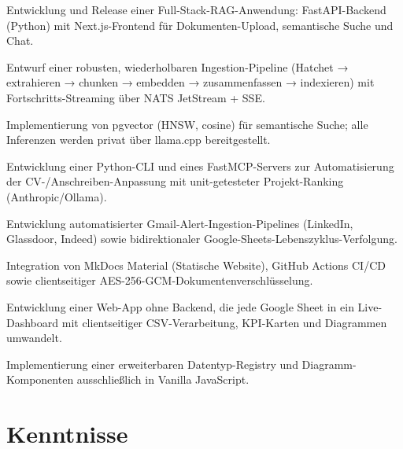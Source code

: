 \documentclass[10pt,a4paper]{resume}
\begin{document}
\bullets
  \item Entwicklung und Release einer Full-Stack-RAG-Anwendung: FastAPI-Backend (Python) mit Next.js-Frontend für Dokumenten-Upload, semantische Suche und Chat.
  \item Entwurf einer robusten, wiederholbaren Ingestion-Pipeline (Hatchet → extrahieren → chunken → embedden → zusammenfassen → indexieren) mit Fortschritts-Streaming über NATS JetStream + SSE.
  \item Implementierung von pgvector (HNSW, cosine) für semantische Suche; alle Inferenzen werden privat über llama.cpp bereitgestellt.
\bulletsend
\vspace{1.0pt}
\bullets
  \item Entwicklung einer Python-CLI und eines FastMCP-Servers zur Automatisierung der CV-/Anschreiben-Anpassung mit unit-getesteter Projekt-Ranking (Anthropic/Ollama).
  \item Entwicklung automatisierter Gmail-Alert-Ingestion-Pipelines (LinkedIn, Glassdoor, Indeed) sowie bidirektionaler Google-Sheets-Lebenszyklus-Verfolgung.
  \item Integration von MkDocs Material (Statische Website), GitHub Actions CI/CD sowie clientseitiger AES-256-GCM-Dokumentenverschlüsselung.
\bulletsend
\vspace{1.0pt}
\bullets
  \item Entwicklung einer Web-App ohne Backend, die jede Google Sheet in ein Live-Dashboard mit clientseitiger CSV-Verarbeitung, KPI-Karten und Diagrammen umwandelt.
  \item Implementierung einer erweiterbaren Datentyp-Registry und Diagramm-Komponenten ausschließlich in Vanilla JavaScript.
\bulletsend

\section{Kenntnisse}
\end{document}
